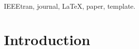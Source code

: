 \documentclass[11pt,journal,compsoc]{IEEEtran}
\begin{document}
\begin{IEEEkeywords}
IEEEtran, journal, \LaTeX, paper, template.
\end{IEEEkeywords}


\maketitle


\IEEEdisplaynotcompsoctitleabstractindextext


%
\IEEEpeerreviewmaketitle



\section{Introduction}
\end{document}
